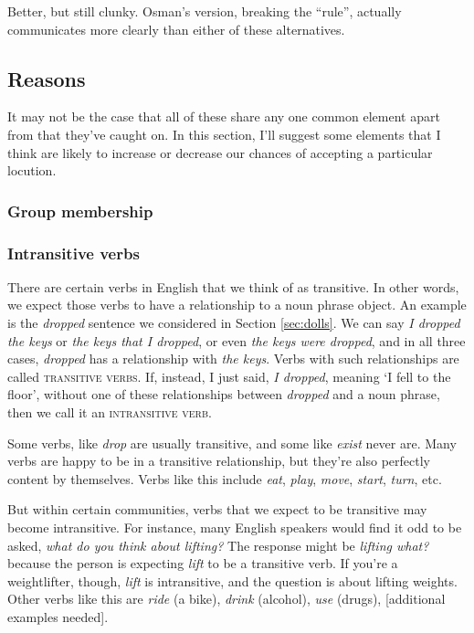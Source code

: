 Better, but still clunky. Osman's version, breaking the ``rule'', actually communicates more clearly than either of these alternatives.

\subsection{Reasons}
It may not be the case that all of these share any one common element apart from that they've caught on. In this section, I'll suggest some elements that I think are likely to increase or decrease our chances of accepting a particular locution.

    \subsubsection{Group membership}
        \subsubsection*{Intransitive verbs} \label{sec:intrans}
            
            There are certain verbs in English that we think of as transitive. In other words, we expect those verbs to have a relationship to a noun phrase object. An example is the \textit{dropped} sentence we considered in Section \ref{sec:dolls}. We can say \textit{I dropped the keys} or \textit{the keys that I dropped}, or even \textit{the keys were dropped}, and in all three cases, \textit{dropped} has a relationship with \textit{the keys}. Verbs with such relationships are called \textsc{transitive verbs}. If, instead, I just said, \textit{I dropped}, meaning `I fell to the floor', without one of these relationships between \textit{dropped} and a noun phrase, then we call it an \textsc{intransitive verb}.
            
            Some verbs, like \textit{drop} are usually transitive, and some like \textit{exist} never are. Many verbs are happy to be in a transitive relationship, but they're also perfectly content by themselves. Verbs like this include \textit{eat}, \textit{play}, \textit{move}, \textit{start}, \textit{turn}, etc.
            
            But within certain communities, verbs that we expect to be transitive may become intransitive. For instance, many English speakers would find it odd to be asked, \textit{what do you think about lifting?} The response might be \textit{lifting what?} because the person is expecting \textit{lift} to be a transitive verb. If you're a weightlifter, though, \textit{lift} is intransitive, and the question is about lifting weights. Other verbs like this are \textit{ride} (a bike), \textit{drink} (alcohol), \textit{use} (drugs), [additional examples needed].
            
